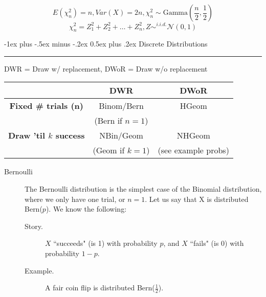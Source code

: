 \documentclass[10pt,landscape]{article}
\makeatletter
\theoremstyle{definition}
\newcommand{\N}{\mathcal{N}}
\newcommand{\Bern}{\textrm{Bern}}
\newcommand{\Gam}{\textrm{Gamma}}
\renewcommand{\section}{\@startsection{section}{1}{0mm}%
                                {-1ex plus -.5ex minus -.2ex}%
                                {0.5ex plus .2ex}%
                                {\normalfont\large\bfseries}}
\makeatother
\begin{document}
\begin{multicols}{3}
\[E(\chi^2_n) = n, Var(X) = 2n, \chi_n^2 \sim \Gam\left(\frac{n}{2}, \frac{1}{2}\right)\]
\[\chi_n^2 = Z_1^2 + Z_2^2 + \dots + Z_n^2, Z \sim^{i.i.d.} \N(0, 1)\]

\section{Discrete Distributions} \smallskip \hrule height 2pt \smallskip

DWR = Draw w/ replacement, DWoR = Draw w/o replacement
\begin{center}
    \begin{tabular}{ccc}
    \toprule
    ~ & \textbf{DWR} & \textbf{DWoR}  \\
    \midrule
        \textbf{Fixed \# trials (n)} & Binom/Bern & HGeom \\ 
        ~ & (Bern if $n = 1$) & ~ \\ 
        \textbf{Draw 'til $k$ success} & NBin/Geom & NHGeom \\ 
        ~ & (Geom if $k = 1$) & (see example probs) \\ \bottomrule
    \end{tabular}
\end{center}

\begin{description}
\item[Bernoulli] The Bernoulli distribution is the simplest case of the Binomial distribution, where we only have one trial, or $n=1$. Let us say that X is distributed \Bern($p$). We know the following:
\begin{description}
    \item[Story.] $X$ ``succeeds" (is 1) with probability $p$, and $X$ ``fails" (is 0) with probability $1-p$.
    \item[Example.] A fair coin flip is distributed \Bern($\frac{1}{2}$).
\end{description}


\end{description}
\end{multicols}
\end{document}

